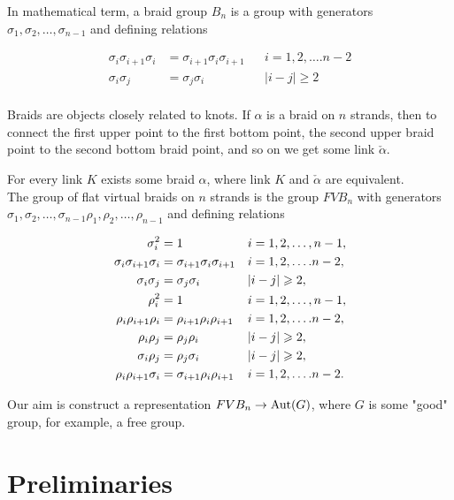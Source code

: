 \documentclass{article}
\begin{document}
In mathematical term, a braid group $B_n$ is a group with generators $\sigma _1,\sigma _2,\dots,\sigma _{n-1}$ and defining relations 

\begin{align*}
\sigma _i\sigma _{i+1}\sigma _i &= \sigma _{i+1}\sigma _i\sigma _{i+1}&&i = 1, 2, \dots. n-2\\
\sigma _i\sigma _j &= \sigma _j\sigma _i&&|i-j|\geqslant   2\\
\end{align*}


Braids are objects closely related to knots. If $\alpha$ is a braid on $n$ strands, then to connect the first upper point to the first bottom point, the second upper braid point to the second bottom braid point, and so on we get some link $\check  \alpha$.

For every link $K$ exists some braid $\alpha$, where link $K$ and $\check  \alpha$ are equivalent.\\


The group of flat virtual braids on $n$ strands is the group $FVB_n$ with generators  $\sigma _1,\sigma _2,\dots,\sigma _{n-1}\rho_1,\rho _2,\dots,\rho _{n-1}$ and defining relations 


\begin{align}
\notag\sigma_i^2&=1 && i = 1, 2, \dots,n-1,\\
\notag\sigma_i\sigma _{i+1}\sigma _i &= \sigma _{i+1}\sigma _i\sigma _{i+1}&& i = 1, 2, \dots. n-2, \\
\notag\sigma _i\sigma _j &= \sigma _j\sigma _i && |i-j|\geqslant   2,\\
\label{def}\rho_i^2&=1 &&i = 1, 2, \dots,n-1, \\
\notag\rho_i\rho _{i+1}\rho _i &= \rho _{i+1}\rho_i\rho _{i+1} &&i = 1, 2, \dots. n-2,\\
\notag\rho _i\rho _j &= \rho _j\rho _i && |i-j|\geqslant 2,\\
\notag\sigma _i\rho _j &= \rho _j\sigma _i &&|i-j|\geqslant   2,\\
\notag\rho_i\rho _{i+1}\sigma _i &= \sigma _{i+1}\rho_i\rho _{i+1} && i = 1, 2, \dots. n-2.
\end{align}


Our aim is construct a representation $FVB_n \rightarrow {\rm Aut} (G)$, where $G$ is some "good" group, for example, a free group.
\section{Preliminaries}
\end{document}
